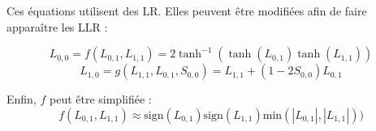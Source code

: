 Ces équations utilisent des LR. Elles peuvent être modifiées afin de faire apparaître les LLR : 

\begin{equation}
L_{0,0} = f(L_{0,1}, L_{1,1}) = 2\tanh^{-1}(\tanh(L_{0,1})\tanh(L_{1,1}))
\end{equation}
\begin{equation}
L_{1,0} = g(L_{1,1},L_{0,1},S_{0,0}) = L_{1,1} + (1 - 2S_{0,0})L_{0,1}
\end{equation}

Enfin, $f$ peut être simplifiée \cite{fossorier1999reduced} : 
\begin{equation}
f(L_{0,1}, L_{1,1}) \approx \text{sign}(L_{0,1})\text{sign}(L_{1,1})\text{min}(|L_{0,1}|,|L_{1,1}|))
\end{equation}